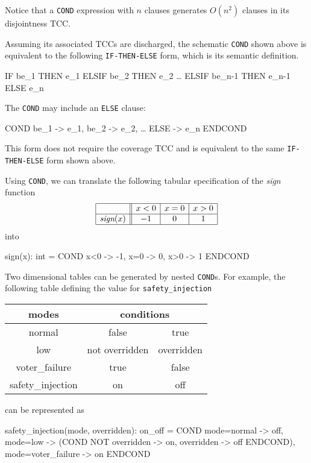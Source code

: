 Notice that a {\tt COND} expression with $n$ clauses generates $O(n^2)$
clauses in its disjointness TCC\@.  

Assuming its associated TCCs are discharged, the schematic {\tt COND}
shown above is equivalent to the following {\tt IF-THEN-ELSE} form,
which is its semantic definition.

\begin{pvsex}
  IF be\_1 THEN e\_1
  ELSIF be\_2 THEN e\_2
          \ldots
  ELSIF be\_n-1 THEN e\_n-1
  ELSE e\_n
\end{pvsex}

The {\tt COND} may include an {\tt ELSE} clause:
\begin{pvsex}
  COND
      be\_1 -> e\_1,
      be\_2 -> e\_2,
        \ldots
      ELSE -> e\_n
  ENDCOND
\end{pvsex}
This form does not require the coverage TCC and is equivalent to the
same {\tt IF-THEN-ELSE} form shown above.



Using {\tt COND}, we can translate the following tabular
specification of the \emph{sign} function
\[
\begin{array}{|c||c|c|c|}
\hline
 & x<0 & x=0 & x>0\\
\hline
\emph{sign}(x) & -1 & 0 & 1\\
\hline
\end{array}
\]
into
\begin{pvsex}
  sign(x): int = COND
                    x<0 -> -1, 
                    x=0 -> 0,
                    x>0 -> 1
                 ENDCOND
\end{pvsex}

Two dimensional tables can be generated by nested {\tt COND}s.  For
example, the following table defining the value for {\tt safety\_injection}
\begin{center}
\begin{tabular}{|c||c|c|}
\hline
modes & \multicolumn{2}{c|}{conditions} \\
\hline
\hline
normal & false & true\\
\hline
low & not overridden & overridden \\
\hline
voter\_failure & true & false\\
\hline
\hline
safety\_injection & on & off\\
\hline
\end{tabular}
\end{center}
can be represented as
\begin{pvsex}
  safety\_injection(mode, overridden): on\_off = 
    COND
      mode=normal -> off,
      mode=low -> (COND NOT overridden -> on, overridden -> off ENDCOND),
      mode=voter\_failure -> on
    ENDCOND
\end{pvsex}

